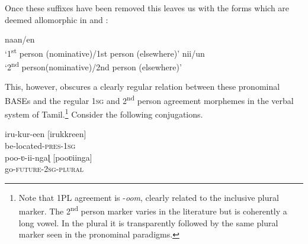 \documentclass[output=paper]{langscibook}
\begin{document}
Once these suffixes have been removed this leaves us with the forms which are deemed allomorphic in \citet{Moskal2015} and \citet{moskal2016towards}:

\begin{exe}
\ex \label{new4}
\begin{xlist}
\ex \label{new4a}
naan/en\\‘1\textsuperscript{st} person (nominative)/1st person (elsewhere)’
\ex \label{new4b}
nii/un\\‘2\textsuperscript{nd} person(nominative)/2nd person (elsewhere)’
\end{xlist}
\end{exe}

This, however, obscures a clearly regular relation between these pronominal BASEs and the regular 1\textsc{sg} and 2\textsuperscript{nd} person agreement morphemes in the verbal system of Tamil.\footnote{Note that 1PL agreement is -\textit{oom}, clearly related to the inclusive plural marker. The 2\textsuperscript{nd} person marker varies in the literature but is coherently a long vowel. In the plural it is transparently followed by the same plural marker seen in the pronominal paradigms.}  Consider the following conjugations.

\begin{exe}
\ex \label{new5}
\begin{xlist}
\ex \label{new5a}
\gll iru-kur-een	\jambox{}		[irukkreen] \\ 
be-located-\textsc{pres}-1\textsc{sg} \\
\ex \label{new5b}
poo-ʋ-ii-ngaɭ	\jambox{}	[pooʋiinga] \\
go-\textsc{future}-2\textsc{sg}-\textsc{plural} \\
\end{xlist}
\end{exe}
\end{document}
